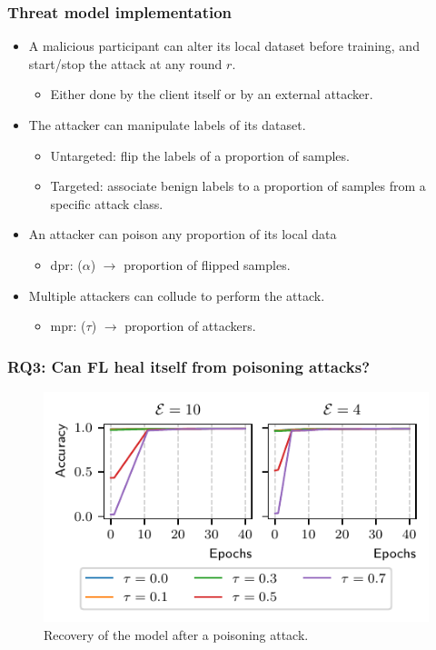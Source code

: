 \documentclass[color,t,presentation,english,aspectratio=169]{beamer}
\begin{document}
\begin{frame}
	\frametitle{Threat model implementation}

	\begin{itemize}
			\item A malicious participant can alter its local dataset before training, and start/stop the attack at any round $r$.
			\begin{itemize}
				\item Either done by the client itself or by an external attacker.
			\end{itemize}
			\item The attacker can manipulate labels of its dataset.
			\begin{itemize}
				\item Untargeted: flip the labels of a proportion of samples.
				\item Targeted: associate benign labels to a proportion of samples from a specific attack class.
			\end{itemize}
			\item An attacker can poison any proportion of its local data
			\begin{itemize}
				\item \Acrfull{dpr}: ($\alpha$) $\rightarrow$ proportion of flipped samples.
			\end{itemize}
			\item Multiple attackers can collude to perform the attack.
			\begin{itemize}
				\item \Acrfull{mpr}: ($\tau$) $\rightarrow$ proportion of attackers.
			\end{itemize}
	\end{itemize}
\end{frame}

\begin{frame}
	\frametitle{RQ3: Can FL heal itself from poisoning attacks?}
	\begin{figure}
		\centering
		\includegraphics[width=.5\textwidth]{figures/redemption.pdf}
		\caption{Recovery of the model after a poisoning attack.}
	\end{figure}
\end{frame}
\end{document}
